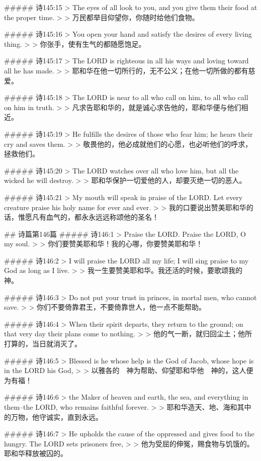 ##### 诗145:15
> The eyes of all look to you, and you give them their food at the proper time.
>
> 万民都举目仰望你，你随时给他们食物。


##### 诗145:16
> You open your hand and satisfy the desires of every living thing.
>
> 你张手，使有生气的都随愿饱足。


##### 诗145:17
> The LORD is righteous in all his ways and loving toward all he has made.
>
> 耶和华在他一切所行的，无不公义；在他一切所做的都有慈爱。


##### 诗145:18
> The LORD is near to all who call on him, to all who call on him in truth.
>
> 凡求告耶和华的，就是诚心求告他的，耶和华便与他们相近。


##### 诗145:19
> He fulfills the desires of those who fear him; he hears their cry and saves them.
>
> 敬畏他的，他必成就他们的心愿，也必听他们的呼求，拯救他们。


##### 诗145:20
> The LORD watches over all who love him, but all the wicked he will destroy.
>
> 耶和华保护一切爱他的人，却要灭绝一切的恶人。


##### 诗145:21
> My mouth will speak in praise of the LORD. Let every creature praise his holy name for ever and ever.
>
> 我的口要说出赞美耶和华的话，惟愿凡有血气的，都永永远远称颂他的圣名！


## 诗篇第146篇
##### 诗146:1
> Praise the LORD. Praise the LORD, O my soul.
>
> 你们要赞美耶和华！我的心哪，你要赞美耶和华！


##### 诗146:2
> I will praise the LORD all my life; I will sing praise to my God as long as I live.
>
> 我一生要赞美耶和华。我还活的时候，要歌颂我的　神。


##### 诗146:3
> Do not put your trust in princes, in mortal men, who cannot save.
>
> 你们不要倚靠君王，不要倚靠世人，他一点不能帮助。


##### 诗146:4
> When their spirit departs, they return to the ground; on that very day their plans come to nothing.
>
> 他的气一断，就归回尘土；他所打算的，当日就消灭了。


##### 诗146:5
> Blessed is he whose help is the God of Jacob, whose hope is in the LORD his God,
>
> 以雅各的　神为帮助、仰望耶和华他　神的，这人便为有福！


##### 诗146:6
> the Maker of heaven and earth, the sea, and everything in them--the LORD, who remains faithful forever.
>
> 耶和华造天、地、海和其中的万物，他守诚实，直到永远。


##### 诗146:7
> He upholds the cause of the oppressed and gives food to the hungry. The LORD sets prisoners free,
>
> 他为受屈的伸冤，赐食物与饥饿的。耶和华释放被囚的。



